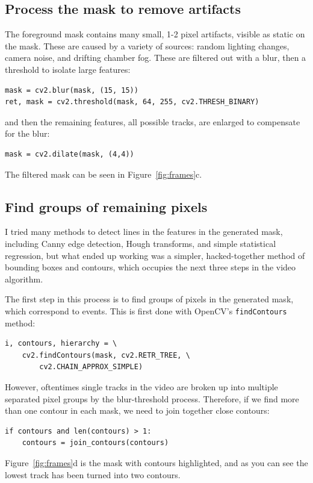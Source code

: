 \documentclass[notitlepage,12pt]{article}
\begin{document}
\subsection{Process the mask to remove artifacts}
The foreground mask contains many small, 1-2 pixel artifacts, visible as static on the mask.  These are caused by a variety of sources: random lighting changes, camera noise, and drifting chamber fog.  These are filtered out with a blur, then a threshold to isolate large features:
\begin{lstlisting}
mask = cv2.blur(mask, (15, 15))
ret, mask = cv2.threshold(mask, 64, 255, cv2.THRESH_BINARY)
\end{lstlisting}
and then the remaining features, all possible tracks, are enlarged to compensate for the blur:
\begin{lstlisting}
mask = cv2.dilate(mask, (4,4))
\end{lstlisting}
The filtered mask can be seen in Figure~\ref{fig:frames}c.

\subsection{Find groups of remaining pixels}
I tried many methods to detect lines in the features in the generated mask, including Canny edge detection, Hough transforms, and simple statistical regression, but what ended up working was a simpler, hacked-together method of bounding boxes and contours, which occupies the next three steps in the video algorithm.

The first step in this process is to find groups of pixels in the generated mask, which correspond to events. This is first done with OpenCV's \texttt{findContours} method:
\begin{lstlisting}
i, contours, hierarchy = \
	cv2.findContours(mask, cv2.RETR_TREE, \
	    cv2.CHAIN_APPROX_SIMPLE)
\end{lstlisting}

However, oftentimes single tracks in the video are broken up into multiple separated pixel groups by the blur-threshold process.  Therefore, if we find more than one contour in each mask, we need to join together close contours:
\begin{lstlisting}
if contours and len(contours) > 1:
	contours = join_contours(contours)
\end{lstlisting}

Figure~\ref{fig:frames}d is the mask with contours highlighted, and as you can see the lowest track has been turned into two contours.
\end{document}
